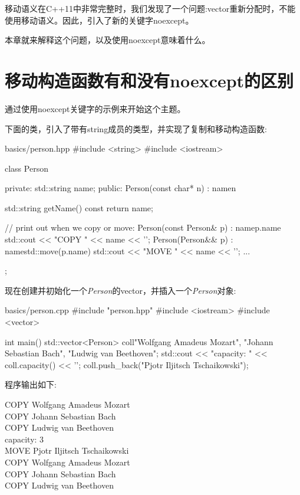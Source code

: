 
移动语义在C++11中非常完整时，我们发现了一个问题:vector重新分配时，不能使用移动语义。因此，引入了新的关键字noexcept。\par

本章就来解释这个问题，以及使用noexcept意味着什么。\par


\section{移动构造函数有和没有noexcept的区别}

通过使用noexcept关键字的示例来开始这个主题。\par


下面的类，引入了带有string成员的类型，并实现了复制和移动构造函数:\par

\begin{codeboxt}[cpp]{basics/person.hpp}
#include <string>
#include <iostream>

class Person {
  private:
  std::string name;
  public:
  Person(const char* n)
  : name{n} {
  }

  std::string getName() const {
    return name;
  }

  // print out when we copy or move:
  Person(const Person& p)
  : name{p.name} {
    std::cout << "COPY " << name << '\n';
  }
  Person(Person&& p)
  : name{std::move(p.name)} {
    std::cout << "MOVE " << name << '\n';
  }
  ...
};
\end{codeboxt}

现在创建并初始化一个\textit{Person}的vector，并插入一个\textit{Person}对象:\par

\begin{codeboxt}[cpp]{basics/person.cpp}
#include "person.hpp"
#include <iostream>
#include <vector>

int main()
{
  std::vector<Person> coll{"Wolfgang Amadeus Mozart",
    "Johann Sebastian Bach",
    "Ludwig van Beethoven"};
  std::cout << "capacity: " << coll.capacity() << '\n';
  coll.push_back("Pjotr Iljitsch Tschaikowski");
}
\end{codeboxt}

程序输出如下:\par

\begin{myOutput}
COPY Wolfgang Amadeus Mozart \\
COPY Johann Sebastian Bach \\
COPY Ludwig van Beethoven \\
capacity: 3 \\
MOVE Pjotr Iljitsch Tschaikowski \\
COPY Wolfgang Amadeus Mozart \\
COPY Johann Sebastian Bach \\
COPY Ludwig van Beethoven
\end{myOutput}


